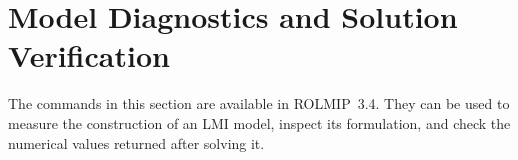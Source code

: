 \documentclass[english,11pt]{article}
\theoremstyle{break} \theorembodyfont{\small\rm}
\begin{document}
%
%
%
%
%
%


\section{Model Diagnostics and Solution Verification}\label{sec_model_diagnostics}
The commands in this section are available in ROLMIP~3.4. They can be
used to measure the construction of an LMI model, inspect its formulation,
and check the numerical values returned after solving it.
\end{document}
